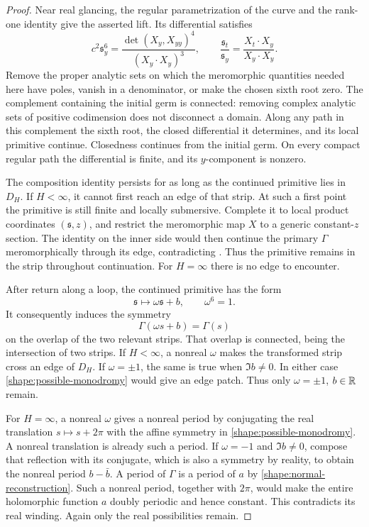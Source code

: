 \begin{proof}
Near real glancing, the regular parametrization of the curve and the
rank-one identity give the asserted lift. Its differential satisfies
\begin{equation}
 c^2\mathfrak s_y^6
  =\frac{\det(X_y,X_{yy})^4}{(X_y\mathbin{\cdot}X_y)^3},
 \qquad
 \frac{\mathfrak s_t}{\mathfrak s_y}
  =\frac{X_t\mathbin{\cdot}X_y}{X_y\mathbin{\cdot}X_y}.
 \label{shape:lift-differential}
\end{equation}
Remove the proper analytic sets on which the meromorphic quantities
needed here have poles, vanish in a denominator, or make the chosen
sixth root zero. The complement containing the initial germ is
connected: removing complex analytic sets of positive codimension
does not disconnect a domain. Along any path in this complement the
sixth root, the closed differential it determines, and its local
primitive continue. Closedness continues from the initial germ.
On every compact regular path the differential is finite, and its
\(y\)-component is nonzero.

The composition identity persists for as long as the continued
primitive lies in \(D_H\). If \(H<\infty\), it cannot first reach an
edge of that strip. At such a first point the primitive is still
finite and locally submersive. Complete it to local product
coordinates \((\mathfrak s,z)\), and restrict the meromorphic map
\(X\) to a generic constant-\(z\) section. The identity on the inner
side would then continue the primary \(\Gamma\) meromorphically
through its edge, contradicting
. Thus the primitive remains in
the strip throughout continuation. For \(H=\infty\) there is no edge
to encounter.

After return along a loop, the continued primitive has the form
\[
 \mathfrak s\longmapsto\omega\mathfrak s+b,
 \qquad \omega^6=1.
\]
It consequently induces the symmetry
\begin{equation}
 \Gamma(\omega s+b)=\Gamma(s)
 \label{shape:possible-monodromy}
\end{equation}
on the overlap of the two relevant strips. That overlap is
connected, being the intersection of two strips. If \(H<\infty\),
a nonreal \(\omega\) makes the transformed strip cross an edge of
\(D_H\). If \(\omega=\pm1\), the same is true when \(\Im b\ne0\).
In either case \eqref{shape:possible-monodromy} would give an edge
patch. Thus only \(\omega=\pm1\), \(b\in\mathbb R\) remain.

For \(H=\infty\), a nonreal \(\omega\) gives a nonreal period by
conjugating the real translation \(s\mapsto s+2\pi\) with the affine
symmetry in \eqref{shape:possible-monodromy}. A nonreal translation
is already such a period. If \(\omega=-1\) and \(\Im b\ne0\),
compose that reflection with its conjugate, which is also a symmetry
by reality, to obtain the nonreal period \(b-\bar b\).
A period of \(\Gamma\) is a period of \(a\) by
\eqref{shape:normal-reconstruction}. Such a nonreal period, together
with \(2\pi\), would make the entire holomorphic function \(a\)
doubly periodic and hence constant. This contradicts its real
winding. Again only the real possibilities remain.


\end{proof}
